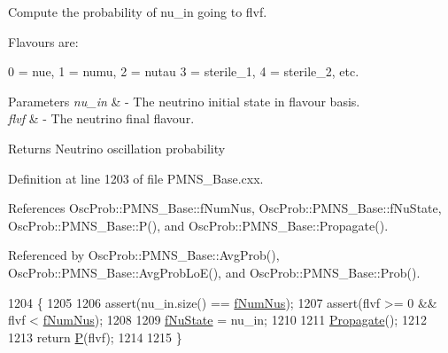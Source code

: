 Compute the probability of nu\+\_\+in going to flvf.

Flavours are\+: 
\begin{DoxyPre}
  0 = nue, 1 = numu, 2 = nutau
  3 = sterile\_1, 4 = sterile\_2, etc.
\end{DoxyPre}
 
\begin{DoxyParams}{Parameters}
{\em nu\+\_\+in} & -\/ The neutrino initial state in flavour basis. \\
\hline
{\em flvf} & -\/ The neutrino final flavour.\\
\hline
\end{DoxyParams}
\begin{DoxyReturn}{Returns}
Neutrino oscillation probability 
\end{DoxyReturn}


Definition at line 1203 of file P\+M\+N\+S\+\_\+\+Base.\+cxx.



References Osc\+Prob\+::\+P\+M\+N\+S\+\_\+\+Base\+::f\+Num\+Nus, Osc\+Prob\+::\+P\+M\+N\+S\+\_\+\+Base\+::f\+Nu\+State, Osc\+Prob\+::\+P\+M\+N\+S\+\_\+\+Base\+::\+P(), and Osc\+Prob\+::\+P\+M\+N\+S\+\_\+\+Base\+::\+Propagate().



Referenced by Osc\+Prob\+::\+P\+M\+N\+S\+\_\+\+Base\+::\+Avg\+Prob(), Osc\+Prob\+::\+P\+M\+N\+S\+\_\+\+Base\+::\+Avg\+Prob\+Lo\+E(), and Osc\+Prob\+::\+P\+M\+N\+S\+\_\+\+Base\+::\+Prob().


\begin{DoxyCode}
1204 \{
1205 
1206   assert(nu\_in.size() == \hyperlink{classOscProb_1_1PMNS__Base_a24bb74bed63569dfe88b18fa6a08060e}{fNumNus});
1207   assert(flvf >= 0 && flvf < \hyperlink{classOscProb_1_1PMNS__Base_a24bb74bed63569dfe88b18fa6a08060e}{fNumNus});
1208 
1209   \hyperlink{classOscProb_1_1PMNS__Base_abf99f2339e3ee989600740b5d88063e8}{fNuState} = nu\_in;
1210 
1211   \hyperlink{classOscProb_1_1PMNS__Base_a054e3a8b05b9a958b6fa416e4a835e3e}{Propagate}();
1212 
1213   \textcolor{keywordflow}{return} \hyperlink{classOscProb_1_1PMNS__Base_a0dc4d45bc3d7e03b9abbf5b4e100cc22}{P}(flvf);
1214 
1215 \}
\end{DoxyCode}
\mbox{\label{classOscProb_1_1PMNS__Base_a0190a79284289aacf682c78d7cef9a81}} 
